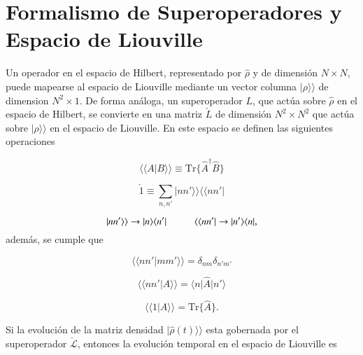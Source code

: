 \label{sec2:estadistica2puntos}



\section{Formalismo de Superoperadores y Espacio de Liouville}
Un operador en el espacio de Hilbert, representado por $\hat{\rho}$ y de dimensión $N\times N$, puede mapearse al espacio de Liouville mediante  un vector columna $|\rho \rangle \rangle$ de dimension $N^{2}\times 1$. De forma análoga, un superoperador \( L \), que actúa sobre \( \hat{\rho} \) en el espacio de Hilbert, se convierte en una matriz \( \check{L} \) de dimensión \( N^2 \times N^2 \) que actúa sobre \( |\rho\rangle\rangle \) en el espacio de Liouville. En este espacio se definen las siguientes operaciones

\begin{equation*}
    \langle \langle A|B\rangle \rangle  \equiv \text{Tr}\{\hat{A}^{\dagger}\hat{B}\}
\end{equation*}

\begin{equation*}
    \check{1}  \equiv \sum_{n,n'}|nn'\rangle \rangle \langle \langle nn'|
\end{equation*}

\begin{equation*}
     |nn'\rangle \rangle   \to |n\rangle \langle n'|  \hspace{10mm}  \langle \langle nn'| \to |n'\rangle \langle n|,
\end{equation*}
además, se cumple que 

\begin{equation*}
     \langle \langle nn'|mm'\rangle \rangle  = \delta_{nm}\delta_{n'm'}
\end{equation*}

\begin{equation*}
    \langle \langle nn'|A\rangle \rangle  = \langle n|\hat{A}|n'\rangle
\end{equation*}

\begin{equation*}
     \langle \langle 1|A\rangle \rangle  = \text{Tr}\{\hat{A}\}.
\end{equation*}


Si la evolución de la matriz densidad $|\hat{\rho}(t)\rangle \rangle$ esta gobernada por el superoperador $\check{\mathcal{L}}$, entonces la evolución temporal en el espacio de Liouville es 

